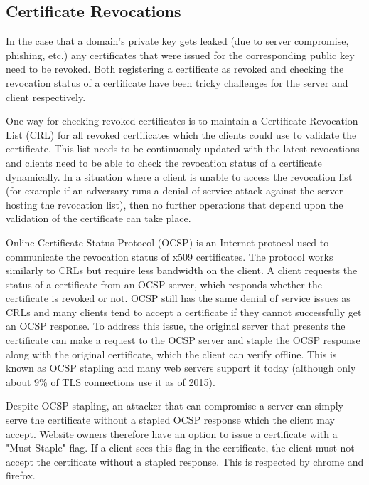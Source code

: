 \subsection{Certificate Revocations}
In the case that a domain's private key gets leaked (due to server compromise,
phishing, etc.) any certificates that were issued for the corresponding public
key need to be revoked. Both registering a certificate as revoked and checking
the revocation status of a certificate have been tricky challenges for the
server and client respectively\cite{revocation-measurement}.

One way for checking revoked certificates is to maintain a Certificate
Revocation List (CRL) for all revoked certificates which the clients could use
to validate the certificate\cite{RFC5280}. This list needs to be continuously
updated with the latest revocations and clients need to be able to check the
revocation status of a certificate dynamically. In a situation where a client
is unable to access the revocation list (for example if an adversary runs a
denial of service attack against the server hosting the revocation list), then
no further operations that depend upon the validation of the certificate can
take place.

Online Certificate Status Protocol (OCSP) is an Internet protocol used to
communicate the revocation status of x509 certificates\cite{RFC6066}. The
protocol works similarly to CRLs but require less bandwidth on the client. A
client requests the status of a certificate from an OCSP server, which responds
whether the certificate is revoked or not. OCSP still has the same denial of
service issues as CRLs and many clients tend to accept a certificate if they
cannot successfully get an OCSP response. To address this issue, the original
server that presents the certificate can make a request to the OCSP server and
staple the OCSP response along with the original certificate, which the client
can verify offline. This is known as OCSP stapling and many web servers support
it today (although only about 9\% of TLS connections use it as of 2015).

Despite OCSP stapling, an attacker that can compromise a server can simply
serve the certificate without a stapled OCSP response which the client may
accept. Website owners therefore have an option to issue a certificate with a
"Must-Staple" flag\cite{must-staple}. If a client sees this flag in the
certificate, the client must not accept the certificate without a stapled
response. This is respected by chrome and firefox.

